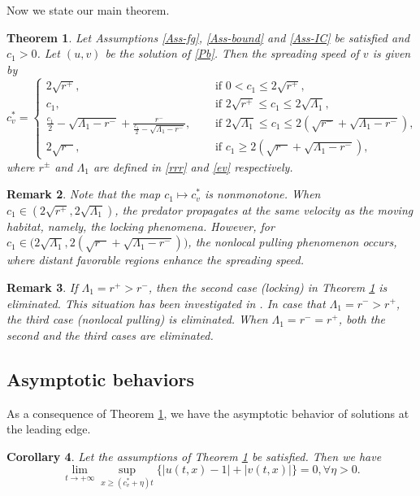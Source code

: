 \documentclass[10pt]{article}
\numberwithin{equation}{section}
\newtheorem{theorem}{Theorem}[section]
\newtheorem{corollary}[theorem]{Corollary}
\newtheorem{remark}[theorem]{Remark}
\begin{document}
Now we  state our main theorem. 
\begin{theorem}\label{Thm1}
Let Assumptions \ref{Ass-fg}, \ref{Ass-bound} and \ref{Ass-IC} be satisfied and $c_1>0$.  Let $(u,v)$ be the solution of  \eqref{Pb}.   Then the  spreading speed of $v$ is given by 
\begin{equation*}
c_v^*= \begin{cases}
2\sqrt{r^+}, & \text{ if  }  0<c_1 \leq 2 \sqrt{r^+}, \\
c_1,   & \text{ if }  2\sqrt{r^+} \leq c_1 \leq  2 \sqrt{\Lambda_1}, \\
\frac{c_1}{2} - \sqrt{\Lambda_1 - r^{-} }  + \frac{r^{-}}{\frac{c_1}{2} - \sqrt{\Lambda_1 - r^{-} }  },   \quad  & \text{ if  }   2 \sqrt{\Lambda_1}  \leq  c_1 \leq 2 (  \sqrt{r^-} + \sqrt{\Lambda_1 -r^{-}}),\\
2\sqrt{r^-},    & \text{ if  } c_1  \geq   2 (  \sqrt{r^-} + \sqrt{\Lambda_1 -r^{-}}),
\end{cases}
\end{equation*}
 where $r^{\pm}$ and $\Lambda_1$ are defined in \eqref{rrr} and \eqref{ev} respectively.   
\end{theorem}
\begin{remark}
Note that the map $c_1 \mapsto c_v^*$  is nonmonotone.
When $ c_1 \in  (2\sqrt{r^+},  2\sqrt{\Lambda_1})$, the  predator propagates at  the same velocity as  the moving habitat, namely, the locking phenomena. However, for $ c_1 \in \big( 2 \sqrt{\Lambda_1},  2 (  \sqrt{r^-} + \sqrt{\Lambda_1 -r^{-}}) \big)$,  the nonlocal pulling  phenomenon  occurs,    where  distant  favorable  regions enhance the  spreading  speed.    
\end{remark}

\begin{remark}
\rm
If $\Lambda_1=r^{+} >r^{-}$, then the second  case (locking)  in Theorem \ref{Thm1} is eliminated. This situation has been investigated in \cite{LamLee2024pp}.    In case that $\Lambda_1=r^{-} >r^{+}$, the  third  case (nonlocal pulling) is eliminated.  When $\Lambda_1=r^{-} =r^{+}$, both the second and the third cases are eliminated.
\end{remark}




\subsection{Asymptotic behaviors}
As a consequence of Theorem \ref{Thm1}, 
we have the asymptotic behavior of solutions  at the leading edge. 
 \begin{corollary}\label{Cor1}
 Let the assumptions of Theorem \ref{Thm1} be satisfied.  Then we have
\begin{equation}\label{11}
\lim_{t \to +\infty} \sup_{ x \geq (c_v^*+ \eta)t} \big\{ \left| u(t,x)-1\right| + \left| v(t,x)\right|     \big\} =0,    \forall \eta >0.
\end{equation}
 \end{corollary}
 
\end{document}
